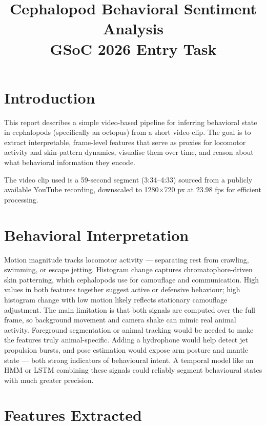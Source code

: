 \documentclass[12pt,a4paper]{article}
\title{
    \textbf{Cephalopod Behavioral Sentiment Analysis} \\
    \large GSoC 2026 Entry Task
}
\author{}
\date{}
\begin{document}
\maketitle

\section{Introduction}

This report describes a simple video-based pipeline for inferring behavioral
state in cephalopods (specifically an octopus) from a short video clip.
The goal is to extract interpretable, frame-level features that serve as
proxies for locomotor activity and skin-pattern dynamics, visualise them over
time, and reason about what behavioral information they encode.

The video clip used is a 59-second segment (3:34–4:33) sourced from a
publicly available YouTube recording, downscaled to 1280$\times$720 px at
23.98 fps for efficient processing.

\section{Behavioral Interpretation}

Motion magnitude tracks locomotor activity — separating rest from crawling, swimming, or escape jetting.
Histogram change captures chromatophore-driven skin patterning, which cephalopods use for camouflage and communication.
High values in both features together suggest active or defensive behaviour; high histogram change with low motion likely reflects stationary camouflage adjustment.
The main limitation is that both signals are computed over the full frame, so background movement and camera shake can mimic real animal activity.
Foreground segmentation or animal tracking would be needed to make the features truly animal-specific.
Adding a hydrophone would help detect jet propulsion bursts, and pose estimation would expose arm posture and mantle state — both strong indicators of behavioural intent.
A temporal model like an HMM or LSTM combining these signals could reliably segment behavioural states with much greater precision.

\section{Features Extracted}
\end{document}
